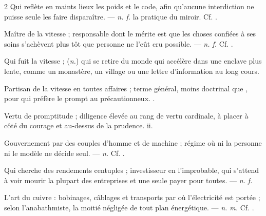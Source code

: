\begin{multicols}{2}
 Qui reflète en maints lieux les poids et le code, afin qu'aucune interdiction ne puisse seule les faire disparaître. —  \textit{n. f.} la pratique du miroir. Cf. .

 Maître de la vitesse ; responsable dont le mérite est que les choses confiées à ses soins s'achèvent plus tôt que personne ne l'eût cru possible. —  \textit{n. f.} Cf. .

 Qui fuit la vitesse ; (\textit{n.}) qui se retire du monde qui accélère dans une enclave plus lente, comme un monastère, un village ou une lettre d'information au long cours.

 Partisan de la vitesse en toutes affaires ; terme général, moins doctrinal que , pour qui préfère le prompt au précautionneux. .

 Vertu de promptitude ; diligence élevée au rang de vertu cardinale, à placer à côté du courage et au-dessus de la prudence.   ii.

 Gouvernement par des couples d'homme et de machine ; régime où ni la personne ni le modèle ne décide seul. —  \textit{n.} Cf. .

 Qui cherche des rendements centuples ; investisseur en l'improbable, qui s'attend à voir mourir la plupart des entreprises et une seule payer pour toutes. —  \textit{n. f.}

 L'art du cuivre : bobinages, câblages et transports par où l'électricité est portée ; selon l'anabathmiste, la moitié négligée de tout plan énergétique.  —  \textit{n. m.} Cf. .


\end{multicols}
